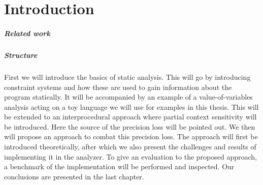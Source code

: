 
\chapter{Introduction}\label{chapter:introduction}


\paragraph{Related work}

\paragraph{Structure} 
First we will introduce the basics of static analysis. This will go by introducing constraint systems and how these are used to gain information about the program statically. It will be accompanied by an example of a value-of-variables analysis acting on a toy language we will use for examples in this thesis. This will be extended to an interprocedural approach where partial context sensitivity will be introduced. Here the source of the precision loss will be pointed out. We then will propose an approach to combat this precision loss. The approach will first be introduced theoretically, after which we also present the challenges and results of implementing it in the \Gob analyzer. To give an evaluation to the proposed approach, a benchmark of the implementation will be performed and inspected. Our conclusions are presented in the last chapter.

